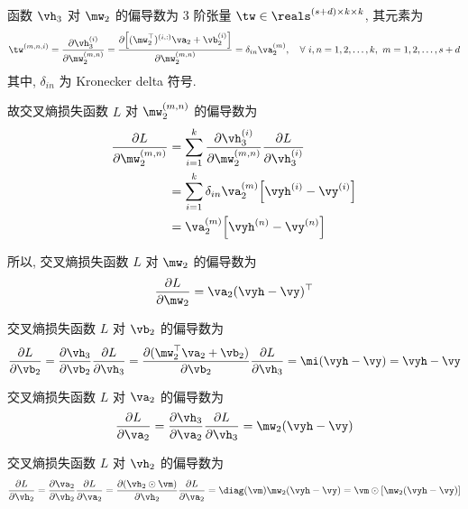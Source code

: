 \documentclass[openany]{ctexbook}
\theoremstyle{kaiti}
\theoremstyle{normal}
\begin{document}
函数 $\vh_3$ 对 $\mw_2$ 的偏导数为 3 阶张量 $\tw\in\reals^{(s+d)\times k\times k}$, 其元素为
\begin{equation}
  \tw^{(m,n,i)}=\frac{\partial \vh_3^{(i)}}{\partial \mw_2^{(m,n)}}=\frac{\partial \Big[(\mw_2^\top)^{(i,:)}\va_2+\vb_2^{(i)}\Big]}{\partial \mw_2^{(m,n)}}=\delta_{in}\va_2^{(m)},\quad\forall~i,n=1,2,\dots,k,~m=1,2,\dots,s+d
\end{equation}
其中, $\delta_{in}$ 为 Kronecker delta 符号.

故交叉熵损失函数 $L$ 对 $\mw_2^{(m,n)}$ 的偏导数为
\begin{equation}
  \begin{aligned}
    \frac{\partial L}{\partial\mw_2^{(m,n)}}
    &=\sum_{i=1}^k\frac{\partial\vh_3^{(i)}}{\partial\mw_2^{(m,n)}}\frac{\partial L}{\partial\vh_3^{(i)}}\\
    &=\sum_{i=1}^k \delta_{in}\va_2^{(m)} \Big[\vyh^{(i)}-\vy^{(i)}\Big]\\
    &=\va_2^{(m)} \Big[\vyh^{(n)}-\vy^{(n)}\Big]\\
  \end{aligned}
\end{equation}

所以, 交叉熵损失函数 $L$ 对 $\mw_2$ 的偏导数为
\begin{equation}
  \frac{\partial L}{\partial \mw_2}=\va_2(\vyh-\vy)^\top
  \label{eq:partialLossWeight}
\end{equation}

交叉熵损失函数 $L$ 对 $\vb_2$ 的偏导数为
\begin{equation}
  \frac{\partial L}{\partial \vb_2}=\frac{\partial\vh_3}{\partial\vb_2}\frac{\partial L}{\partial \vh_3}=\frac{\partial(\mw_2^\top\va_2+\vb_2)}{\partial\vb_2}\frac{\partial L}{\partial \vh_3}=\mi(\vyh-\vy)=\vyh-\vy
\end{equation}

交叉熵损失函数 $L$ 对 $\va_2$ 的偏导数为
\begin{equation}
  \frac{\partial L}{\partial \va_2}=\frac{\partial\vh_3}{\partial\va_2}\frac{\partial L}{\partial \vh_3}=\mw_2(\vyh-\vy)
\end{equation}

交叉熵损失函数 $L$ 对 $\vh_2$ 的偏导数为
\begin{equation}
  \frac{\partial L}{\partial \vh_2}=\frac{\partial\va_2}{\partial\vh_2}\frac{\partial L}{\partial \va_2}=\frac{\partial(\vh_2\odot\vm)}{\partial\vh_2}\frac{\partial L}{\partial \va_2}=\diag(\vm)\mw_2(\vyh-\vy)=\vm\odot[\mw_2(\vyh-\vy)]
\end{equation}
\end{document}
